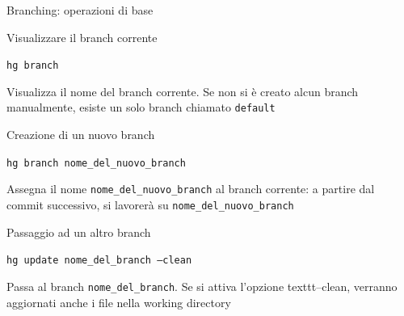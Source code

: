 \documentclass[presentation]{beamer}
\begin{document}
\begin{frame}{Branching: operazioni di base}
	\begin{block}{Visualizzare il branch corrente}
		\begin{center}
			\texttt{hg branch}
		\end{center}
		Visualizza il nome del branch corrente. Se non si è creato alcun branch manualmente, esiste un solo branch chiamato \texttt{default}
	\end{block}
	\begin{block}{Creazione di un nuovo branch}
		\begin{center}
			\texttt{hg branch nome\_del\_nuovo\_branch}
		\end{center}
		Assegna il nome \texttt{nome\_del\_nuovo\_branch} al branch corrente: a partire dal commit successivo, si lavorerà su \texttt{nome\_del\_nuovo\_branch}
	\end{block}
	\begin{block}{Passaggio ad un altro branch}
		\begin{center}
			\texttt{hg update nome\_del\_branch --clean}
		\end{center}
		Passa al branch \texttt{nome\_del\_branch}. Se si attiva l'opzione texttt{--clean}, verranno aggiornati anche i file nella working directory
	\end{block}
\end{frame}


\end{document}
